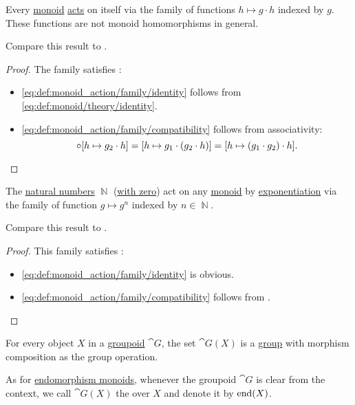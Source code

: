\begin{proposition}\label{thm:monoid_is_action}
  Every \hyperref[def:monoid]{monoid} \hyperref[def:monoid_action]{acts} on itself via the family of functions \( h \mapsto g \cdot h \) indexed by \( g \). These functions are not monoid homomorphisms in general.

  Compare this result to .
\end{proposition}
\begin{proof}
  The family satisfies :
  \begin{itemize}
    \item \ref{eq:def:monoid_action/family/identity} follows from \eqref{eq:def:monoid/theory/identity}.

    \item \ref{eq:def:monoid_action/family/compatibility} follows from associativity:
    \begin{equation*}
      [h \mapsto g_1 \cdot h] \bincirc [h \mapsto g_2 \cdot h] = [h \mapsto g_1 \cdot (g_2 \cdot h)] = [h \mapsto (g_1 \cdot g_2) \cdot h].
    \end{equation*}
  \end{itemize}
\end{proof}

\begin{proposition}\label{thm:exponentiation_monoid_action}
  The \hyperref[def:set_of_natural_numbers]{natural numbers} \( \BbbN \) (\hyperref[rem:peano_arithmetic_zero]{with zero}) act on any \hyperref[def:monoid]{monoid} by \hyperref[def:monoid/exponentiation]{exponentiation} via the family of function \( g \mapsto g^n \) indexed by \( n \in \BbbN \).

  Compare this result to .
\end{proposition}
\begin{proof}
  This family satisfies :
  \begin{itemize}
    \item \ref{eq:def:monoid_action/family/identity} is obvious.
    \item \ref{eq:def:monoid_action/family/compatibility} follows from .
  \end{itemize}
\end{proof}

\begin{definition}\label{def:automorphism_group}
  For every object \( X \) in a \hyperref[def:groupoid]{groupoid} \( \cat{G} \), the set \( \cat{G}(X) \) is a \hyperref[def:group]{group} with morphism composition as the group operation.

  As for \hyperref[def:endomorphism_monoid]{endomorphism monoids}, whenever the groupoid \( \cat{G} \) is clear from the context, we call \( \cat{G}(X) \) the  over \( X \) and denote it by \( \operatorname{end}(X) \).
\end{definition}


